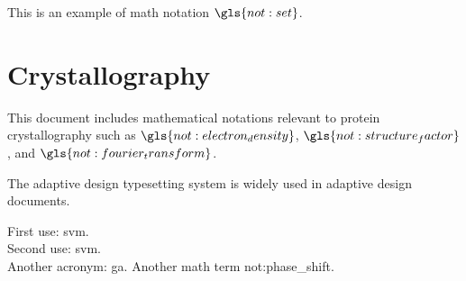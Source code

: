 \documentclass{article}
\begin{document}
\printglossary[type=\acronymtype] %

\newpage{}

This is an example of math notation $\gls{not:set}$.

\clearpage
\glsaddall[types={notation}] %
\printglossary[type=notation, title=Mathematical Notation]


\section*{Crystallography}
This document includes mathematical notations relevant to protein crystallography such as $\gls{not:electron_density}$, $\gls{not:structure_factor}$, and $\gls{not:fourier_transform}$.


The \gls{adaptive design} typesetting system is widely used in \gls{adaptive design} documents.

First use: \gls{svm}.\\
Second use: \gls{svm}.\\
Another acronym: \gls{ga}.
Another math term \gls{not:phase_shift}.

\clearpage
\printglossary %
\end{document}
